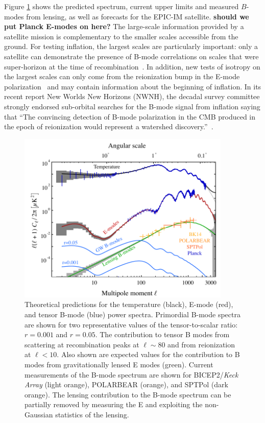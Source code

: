 Figure \ref{fig:clall} shows the predicted spectrum, current upper limits and measured $B$-modes from lensing, 
as well as forecasts for the EPIC-IM satellite. {\bf should we put Planck E-modes on here?} The large-scale information 
provided by a satellite mission is complementary to the smaller scales accessible from the ground. For testing inflation, 
the largest scales are particularly important: only a satellite can demonstrate the presence of B-mode correlations on 
scales that were super-horizon at the time of recombination~\cite{Lee:2014cya}. In addition, new tests of isotropy on the 
largest scales can only come from the reionization bump in the E-mode polarization~\cite{} and may contain information 
about the beginning of inflation. In its recent report New Worlds New Horizons (NWNH), the decadal survey committee 
strongly endorsed sub-orbital searches for the B-mode signal from inflation saying that ``The convincing detection of 
B-mode polarization in the CMB produced in the epoch of reionization would represent a watershed discovery.''~\cite{blandford2010}. 
\begin{figure}[h]
\begin{center}
\includegraphics[width=4in]{figs/cmb_powspec_v1.pdf}
\end{center}
\caption{Theoretical predictions for the temperature (black), 
E-mode (red), and tensor B-mode (blue) power spectra. Primordial 
B-mode spectra are shown for two representative values of the tensor-to-scalar
ratio: $r=0.001$ and $r=0.05.$ 
The contribution to tensor B modes from scattering at recombination peaks at $\ell \sim 80$
and from reionization at $\ell < 10$.
Also shown are expected values for the contribution to B modes from gravitationally lensed E modes (green).
Current measurements of the B-mode spectrum are shown for {BICEP}2/{\em Keck Array} (light orange), POLARBEAR (orange), and SPTPol (dark orange). 
The lensing contribution to the B-mode spectrum can be partially removed by measuring the 
E and exploiting the non-Gaussian statistics of the lensing.
}
\label{fig:clall}
\end{figure}



